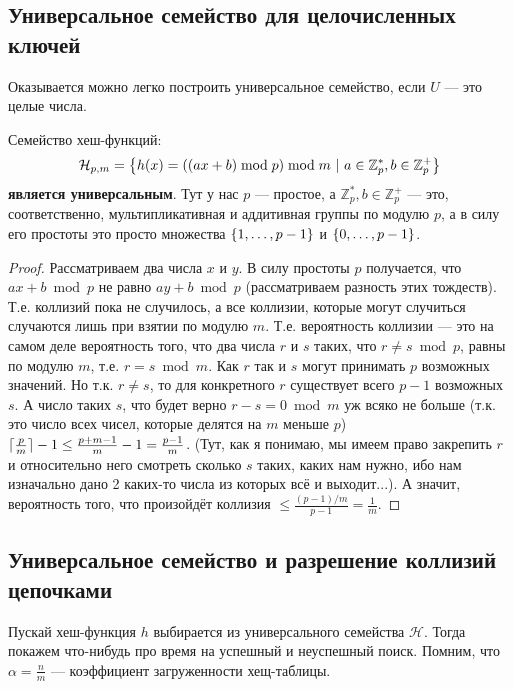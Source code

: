 \subsection{Универсальное семейство для целочисленных ключей}
Оказывается можно легко построить универсальное семейство, если $U$ --- это целые числа.
\begin{thm}
Семейство хеш-функций:
\[
    \mathcal{H}_{p,m} = \left\lbrace h(x) = ((ax + b) \bmod p) \bmod m\ |\ a \in \mathbb{Z}^*_p, b \in \mathbb{Z}^+_p \right\rbrace
\]
\textbf{является универсальным}. 
Тут у нас $p$ --- простое, а $\mathbb{Z}^*_p, b \in \mathbb{Z}^+_p$ --- это, соответственно, мультипликативная и аддитивная группы по модулю $p$, а в силу его простоты это просто множества $\left\lbrace 1,\ldots,p-1 \right\rbrace$ и $\left\lbrace 0,\ldots,p-1 \right\rbrace$.
\end{thm}
\begin{proof}
Рассматриваем два числа $x$ и $y$. В силу простоты $p$ получается, что $ax+b \bmod p$ не равно $ay+b\bmod p$ (рассматриваем разность этих тождеств). Т.е. коллизий пока не случилось, а все коллизии, которые могут случиться случаются лишь при взятии по модулю $m$. Т.е. вероятность коллизии --- это на самом деле вероятность того, что два числа $r$ и $s$ таких, что $r \neq s \bmod p$, равны по модулю $m$, т.е. $r = s \bmod m$. Как $r$ так и $s$ могут принимать $p$ возможных значений. Но т.к. $r \neq s$, то для конкретного $r$ существует всего $p-1$ возможных $s$. А число таких $s$, что будет верно $r - s = 0\bmod m$ уж всяко не больше (т.к. это число всех чисел, которые делятся на $m$ меньше $p$) $\lceil\frac{p}{m}\rceil-1\leq \frac{p+m-1}{m}-1=\frac{p-1}{m}$. (Тут, как я понимаю, мы имеем право закрепить $r$ и относительно него смотреть сколько $s$ таких, каких нам нужно, ибо нам изначально дано 2 каких-то числа из которых всё и выходит...). А значит, вероятность того, что произойдёт коллизия $\leq \frac{(p-1)/m}{p-1} = \frac{1}{m}$.
\end{proof}

\subsection{Универсальное семейство и разрешение коллизий цепочками}
Пускай хеш-функция $h$ выбирается из универсального семейства $\mathcal{H}$. Тогда покажем что-нибудь про время на успешный и неуспешный поиск. Помним, что $\alpha = \frac{n}{m}$ --- коэффициент загруженности хещ-таблицы.

